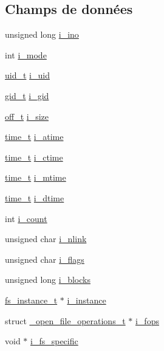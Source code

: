 \subsection*{Champs de données}
\begin{DoxyCompactItemize}
\item 
unsigned long \hyperlink{struct__inode__t_aba602b843ba63a32ca3950dbaf7e959c}{i\-\_\-ino}
\item 
int \hyperlink{struct__inode__t_acead4732b6c22ef17ada59203509e728}{i\-\_\-mode}
\item 
\hyperlink{kstat_8h_af2306308627701b66dc6f3babe821ab4}{uid\-\_\-t} \hyperlink{struct__inode__t_a7ddcb65050ac0b4c9cfbacd495d56f4b}{i\-\_\-uid}
\item 
\hyperlink{kstat_8h_aa7352f1065fe606194d792e2b292cf83}{gid\-\_\-t} \hyperlink{struct__inode__t_a95d052a6e9b1b1e4f6837fa0f33b393e}{i\-\_\-gid}
\item 
\hyperlink{libc_2include_2sys_2types_8h_a447a6a64dbb8fb44b1e62856b333db4a}{off\-\_\-t} \hyperlink{struct__inode__t_aed37b31c96c90873201abfc8b4b3e463}{i\-\_\-size}
\item 
\hyperlink{time_8h_aaaf414ca0598a3633e6e9161cbb5a58a}{time\-\_\-t} \hyperlink{struct__inode__t_a01f50c6c44a3b50e4414a794643b741f}{i\-\_\-atime}
\item 
\hyperlink{time_8h_aaaf414ca0598a3633e6e9161cbb5a58a}{time\-\_\-t} \hyperlink{struct__inode__t_a73ee1e604547b74b8e1045fd4f6699b6}{i\-\_\-ctime}
\item 
\hyperlink{time_8h_aaaf414ca0598a3633e6e9161cbb5a58a}{time\-\_\-t} \hyperlink{struct__inode__t_a331d724391efce2f89aeb1a503ae5c43}{i\-\_\-mtime}
\item 
\hyperlink{time_8h_aaaf414ca0598a3633e6e9161cbb5a58a}{time\-\_\-t} \hyperlink{struct__inode__t_a393de4c58241168fdf397ab8421a3539}{i\-\_\-dtime}
\item 
int \hyperlink{struct__inode__t_a8ea768d56d01e010bc0c809bc38dbb28}{i\-\_\-count}
\item 
unsigned char \hyperlink{struct__inode__t_a929fc1e6837d02a2525027a121b4e67e}{i\-\_\-nlink}
\item 
unsigned char \hyperlink{struct__inode__t_a36ff48a57a9e483d74682972d31ef46c}{i\-\_\-flags}
\item 
unsigned long \hyperlink{struct__inode__t_a92ebe4c1e93af9fba4efae4d07e14858}{i\-\_\-blocks}
\item 
\hyperlink{vfs_8h_a0eefa9aac35a5462ebf1e038992ca860}{fs\-\_\-instance\-\_\-t} $\ast$ \hyperlink{struct__inode__t_affefc88b22f45e2ec8340d582486d0f2}{i\-\_\-instance}
\item 
struct \hyperlink{struct__open__file__operations__t}{\-\_\-open\-\_\-file\-\_\-operations\-\_\-t} $\ast$ \hyperlink{struct__inode__t_acf149d7d1601f78142b1eec480badf7e}{i\-\_\-fops}
\item 
void $\ast$ \hyperlink{struct__inode__t_a54e34439c448c46bae90fd040dadc5c0}{i\-\_\-fs\-\_\-specific}
\end{DoxyCompactItemize}


